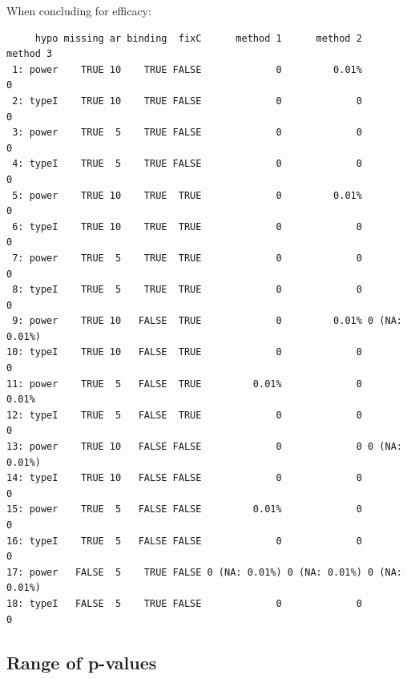 \documentclass[12pt]{article}
\begin{document}
When concluding for efficacy:
\begin{verbatim}
     hypo missing ar binding  fixC      method 1      method 2      method 3
 1: power    TRUE 10    TRUE FALSE             0         0.01%             0
 2: typeI    TRUE 10    TRUE FALSE             0             0             0
 3: power    TRUE  5    TRUE FALSE             0             0             0
 4: typeI    TRUE  5    TRUE FALSE             0             0             0
 5: power    TRUE 10    TRUE  TRUE             0         0.01%             0
 6: typeI    TRUE 10    TRUE  TRUE             0             0             0
 7: power    TRUE  5    TRUE  TRUE             0             0             0
 8: typeI    TRUE  5    TRUE  TRUE             0             0             0
 9: power    TRUE 10   FALSE  TRUE             0         0.01% 0 (NA: 0.01%)
10: typeI    TRUE 10   FALSE  TRUE             0             0             0
11: power    TRUE  5   FALSE  TRUE         0.01%             0         0.01%
12: typeI    TRUE  5   FALSE  TRUE             0             0             0
13: power    TRUE 10   FALSE FALSE             0             0 0 (NA: 0.01%)
14: typeI    TRUE 10   FALSE FALSE             0             0             0
15: power    TRUE  5   FALSE FALSE         0.01%             0             0
16: typeI    TRUE  5   FALSE FALSE             0             0             0
17: power   FALSE  5    TRUE FALSE 0 (NA: 0.01%) 0 (NA: 0.01%) 0 (NA: 0.01%)
18: typeI   FALSE  5    TRUE FALSE             0             0             0
\end{verbatim}

\subsection{Range of p-values}
\label{sec:orge5dc5d6}
\end{document}
